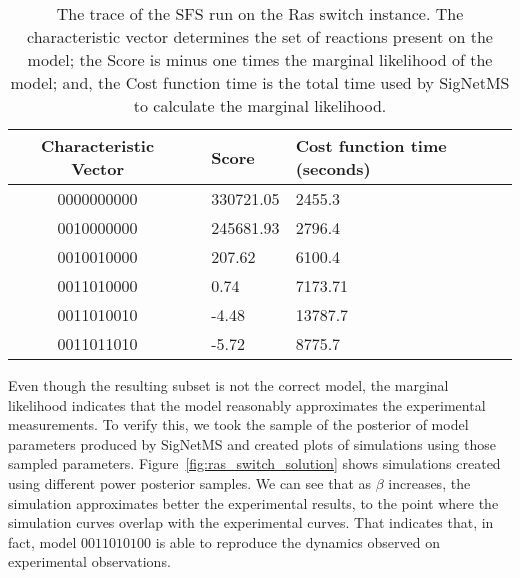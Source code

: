 \begin{table}[H]
\centering
\begin{tabular}{c|cll}
\hline
Characteristic Vector && \multicolumn{1}{l}{Score} &
\multicolumn{1}{l}{Cost function time (seconds)} \\
\hline
    0000000000 && 330721.05	& 2455.3	\\
    0010000000 && 245681.93	& 2796.4	\\
    0010010000 && 207.62	& 6100.4	\\
    0011010000 && 0.74	    & 7173.71	\\
    0011010010 && -4.48	    & 13787.7	\\  
    0011011010 && -5.72	    & 8775.7	\\  
\hline
\hline
\end{tabular}
\caption{The trace of the SFS run on the Ras switch instance. The
    characteristic vector determines the set of reactions present on the
    model; the Score is minus one times the marginal likelihood of
    the model; and, the Cost function time is the total time used by 
    SigNetMS to calculate the marginal likelihood.}
\label{tab:sfs_trace}
\end{table}

Even though the resulting subset is not the correct model, the marginal
likelihood indicates that the model reasonably approximates the
experimental measurements. To verify this, we took the sample of the
posterior of model parameters produced by SigNetMS and created plots of 
simulations using those sampled parameters.
Figure~\ref{fig:ras_switch_solution} shows simulations created using
different power posterior samples. We can see that as $\beta$ increases,
the simulation approximates better the experimental results, to the
point where the simulation curves overlap with the experimental curves.
That indicates that, in fact, model $0011010100$ is able to reproduce
the dynamics observed on experimental observations.

